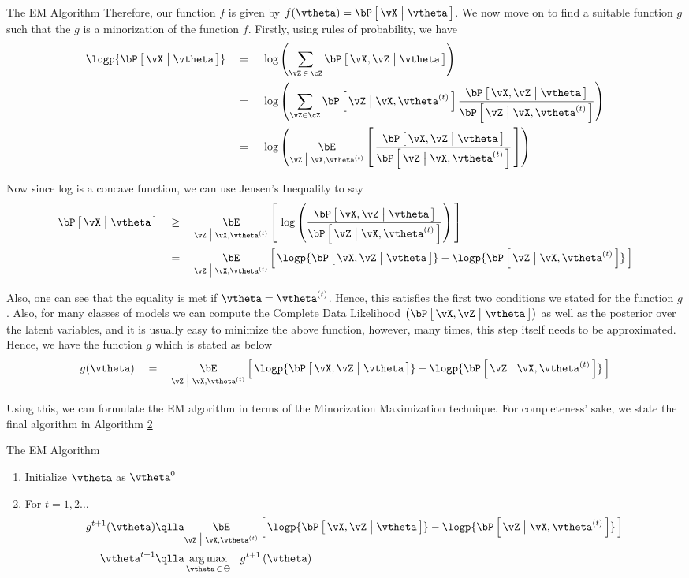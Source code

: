 \documentclass[11pt,a4paper]{article}
\begin{document}
\begin{ssection}{The EM Algorithm}
	Therefore, our function $f$ is given by $f(\vtheta) = \prob{\vX \pipe \vtheta}$. We now move on to find a suitable function $g$ such that the $g$ is a minorization of the function $f$. Firstly, using rules of probability, we have
	\begin{align*}
		\logp{\prob{\vX \pipe \vtheta}} &\eq \log{\sum_{\vZ\,\in\,\cZ} \prob{\vX, \vZ \pipe \vtheta}} \\
		&\eq \log{\sum_{\vZ \in \cZ} \prob{\vZ \pipe \vX, \vtheta^{(t)}} \frac{\prob{\vX, \vZ \pipe \vtheta}}{\prob{\vZ \pipe \vX, \vtheta^{(t)}}}} \\
		&\eq \log{\E[\vZ \pipe \vX, \vtheta^{(t)}]{\frac{\prob{\vX, \vZ \pipe \vtheta}}{\prob{\vZ \pipe \vX, \vtheta^{(t)}}}}}
	\end{align*}

	Now since log is a concave function, we can use Jensen's Inequality to say
	\begin{align*}
		\prob{\vX \pipe \vtheta} &\qge \E[\vZ \pipe \vX, \vtheta^{(t)}]{\log{\frac{\prob{\vX, \vZ \pipe \vtheta}}{\prob{\vZ \pipe \vX, \vtheta^{(t)}}}}} \\
		&\eq \E[\vZ \pipe \vX, \vtheta^{(t)}]{\logp{\prob{\vX, \vZ \pipe \vtheta}} - \logp{\prob{\vZ \pipe \vX, \vtheta^{(t)}}}} \\
	\end{align*}

	Also, one can see that the equality is met if $\vtheta = \vtheta^{(t)}$. Hence, this satisfies the first two conditions we stated for the function $g$. Also, for many classes of models we can compute the Complete Data Likelihood $\para{\prob{\vX, \vZ \pipe \vtheta}}$ as well as the posterior over the latent variables, and it is usually easy to minimize the above function, however, many times, this step itself needs to be approximated. Hence, we have the function $g$ which is stated as below
	\begin{align*}
		g(\vtheta) \eq \E[\vZ \pipe \vX, \vtheta^{(t)}]{\logp{\prob{\vX, \vZ \pipe \vtheta}} - \logp{\prob{\vZ \pipe \vX, \vtheta^{(t)}}}}
	\end{align*}

	Using this, we can formulate the EM algorithm in terms of the Minorization Maximization technique. For completeness' sake, we state the final algorithm in Algorithm \hyperlink{algo:2}{2}

	\begin{algo}[0.9\textwidth]{The EM Algorithm}
		\begin{enumerate}
			\item Initialize $\vtheta$ as $\vtheta^0$
			\item For $t = 1, 2 \dots$
				\begin{align*}
					g^{t + 1}(\vtheta)	&\qlla	\E[\vZ \pipe \vX, \vtheta^{(t)}]{\logp{\prob{\vX, \vZ \pipe \vtheta}} - \logp{\prob{\vZ \pipe \vX, \vtheta^{(t)}}}} \\
					\vtheta^{t + 1}		&\qlla	\argmax{\vtheta\,\in\,\Theta}\ \func{g^{t + 1}}{\vtheta}
				\end{align*}
		\end{enumerate}
	\end{algo}


\end{ssection}
\end{document}
